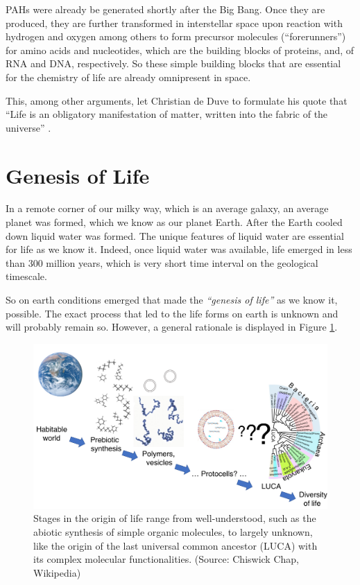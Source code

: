 \documentclass[
  11pt,
]{book}
\begin{document}
PAHs were already be generated shortly after the Big Bang. Once they are produced, they are further transformed in interstellar space upon reaction with hydrogen and oxygen among others to form precursor molecules (``forerunners'') for amino acids and nucleotides, which are the building blocks of proteins, and, of RNA and DNA, respectively. So these simple building blocks that are essential for the chemistry of life are already omnipresent in space.

This, among other arguments, let Christian de Duve to formulate his quote that ``Life is an obligatory manifestation of matter, written into the fabric of the universe'' \citep{deDuve2002}.

\hypertarget{genesis-of-life}{%
\section{Genesis of Life}\label{genesis-of-life}}

In a remote corner of our milky way, which is an average galaxy, an average planet was formed, which we know as our planet Earth.
After the Earth cooled down liquid water was formed. The unique features of liquid water are essential for life as we know it.
Indeed, once liquid water was available, life emerged in less than 300 million years, which is very short time interval on the geological timescale.

So on earth conditions emerged that made the \emph{``genesis of life''} as we know it, possible. The exact process that led to the life forms on earth is unknown and will probably remain so.
However, a general rationale is displayed in Figure \ref{fig:originOfLife}.

\begin{figure}

{\centering \includegraphics[width=1\linewidth]{./figs/origin_of_life_stages} 

}

\caption{Stages in the origin of life range from well-understood, such as the abiotic synthesis of simple organic molecules, to largely unknown, like the origin of the last universal common ancestor (LUCA) with its complex molecular functionalities. (Source: Chiswick Chap, Wikipedia)}\label{fig:originOfLife}
\end{figure}
\end{document}
